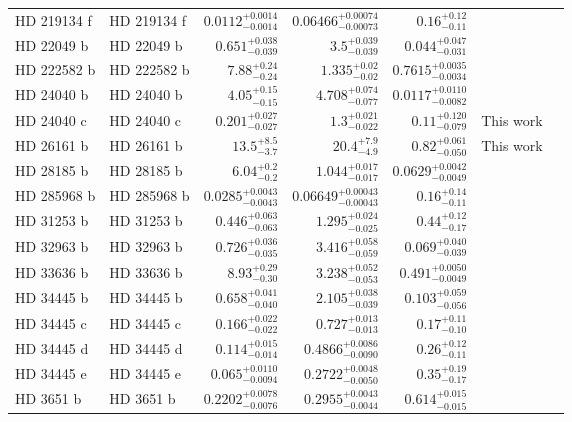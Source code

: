 \begin{longtable*}{llrrrrr}
HD 219134 f & HD 219134 f & $0.0112^{+0.0014}_{-0.0014}$ & $0.06466^{+0.00074}_{-0.00073}$ & $0.16^{+0.12}_{-0.11}$ & \cite{Vogt15} & \\ 
HD 22049 b & HD 22049 b & $0.651^{+0.038}_{-0.039}$ & $3.5^{+0.039}_{-0.039}$ & $0.044^{+0.047}_{-0.031}$ & \cite{Hatzes00} & \\ 
HD 222582 b & HD 222582 b & $7.88^{+0.24}_{-0.24}$ & $1.335^{+0.02}_{-0.02}$ & $0.7615^{+0.0035}_{-0.0034}$ & \cite{Vogt00} & \\ 
HD 24040 b & HD 24040 b & $4.05^{+0.15}_{-0.15}$ & $4.708^{+0.074}_{-0.077}$ & $0.0117^{+0.0110}_{-0.0082}$ & \cite{Boisse12} & \\ 
HD 24040 c & HD 24040 c & $0.201^{+0.027}_{-0.027}$ & $1.3^{+0.021}_{-0.022}$ & $0.11^{+0.120}_{-0.079}$ & This work & \\ 
HD 26161 b & HD 26161 b & $13.5^{+8.5}_{-3.7}$ & $20.4^{+7.9}_{-4.9}$ & $0.82^{+0.061}_{-0.050}$ & This work & \\ 
HD 28185 b & HD 28185 b & $6.04^{+0.2}_{-0.2}$ & $1.044^{+0.017}_{-0.017}$ & $0.0629^{+0.0042}_{-0.0049}$ & \cite{Santos01} & \\ 
HD 285968 b & HD 285968 b & $0.0285^{+0.0043}_{-0.0043}$ & $0.06649^{+0.00043}_{-0.00043}$ & $0.16^{+0.14}_{-0.11}$ & \cite{Forveille09} & \\ 
HD 31253 b & HD 31253 b & $0.446^{+0.063}_{-0.063}$ & $1.295^{+0.024}_{-0.025}$ & $0.44^{+0.12}_{-0.17}$ & \cite{Meschiari11} & \\ 
HD 32963 b & HD 32963 b & $0.726^{+0.036}_{-0.035}$ & $3.416^{+0.058}_{-0.059}$ & $0.069^{+0.040}_{-0.039}$ & \cite{Rowan16} & \\ 
HD 33636 b & HD 33636 b & $8.93^{+0.29}_{-0.30}$ & $3.238^{+0.052}_{-0.053}$ & $0.491^{+0.0050}_{-0.0049}$ & \cite{Vogt02} & \\ 
HD 34445 b & HD 34445 b & $0.658^{+0.041}_{-0.040}$ & $2.105^{+0.038}_{-0.039}$ & $0.103^{+0.059}_{-0.056}$ & \cite{Howard10} & \\ 
HD 34445 c & HD 34445 c & $0.166^{+0.022}_{-0.022}$ & $0.727^{+0.013}_{-0.013}$ & $0.17^{+0.11}_{-0.10}$ & \cite{Vogt17} & \\ 
HD 34445 d & HD 34445 d & $0.114^{+0.015}_{-0.014}$ & $0.4866^{+0.0086}_{-0.0090}$ & $0.26^{+0.12}_{-0.11}$ & \cite{Vogt17} & \\ 
HD 34445 e & HD 34445 e & $0.065^{+0.0110}_{-0.0094}$ & $0.2722^{+0.0048}_{-0.0050}$ & $0.35^{+0.19}_{-0.17}$ & \cite{Vogt17} & \\ 
HD 3651 b & HD 3651 b & $0.2202^{+0.0078}_{-0.0076}$ & $0.2955^{+0.0043}_{-0.0044}$ & $0.614^{+0.015}_{-0.015}$ & \cite{Butler06} & \\ 

\end{longtable*}
